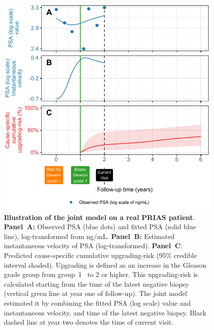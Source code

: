 \begin{figure}
\centerline{\includegraphics{contents/c5/images/c5_fig3.pdf}}
\caption{\textbf{Illustration of the joint model on a real PRIAS patient}. \textbf{Panel~A:} Observed PSA (blue dots) and fitted PSA (solid blue line), log-transformed from ng/mL. \textbf{Panel~B:} Estimated instantaneous velocity of PSA (log-transformed). \textbf{Panel~C}: Predicted cause-specific cumulative upgrading-risk (95\% credible interval shaded). Upgrading is defined as an increase in the Gleason grade group from group~1~\citep{epsteinGG2014} to 2 or higher. This upgrading-risk is calculated starting from the time of the latest negative biopsy (vertical green line at year one of follow-up). The joint model estimated it by combining the fitted PSA (log scale) value and instantaneous velocity, and time of the latest negative biopsy. Black dashed line at year two denotes the time of current visit.}
\label{c5:fig:3}
\end{figure}

